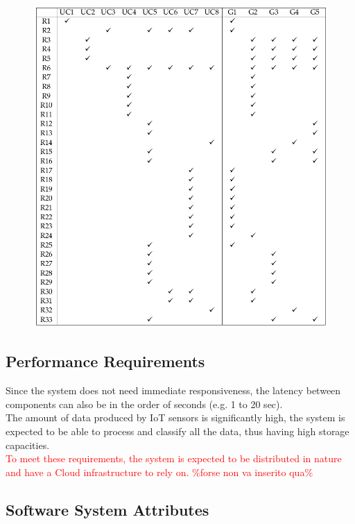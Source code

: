 \documentclass[10pt]{article}
\begin{document}
\begin{figure}[h]
    \includegraphics[scale=0.46]{trac_matrix-1.png} 
    \end{figure}
\newpage
\subsection{Performance Requirements}
Since the system does not need immediate responsiveness, the latency between components can also be in the order of seconds (e.g. 1 to 20 sec).\\
The amount of data produced by IoT sensors is significantly high, the system is expected to be able to process and classify all the data, thus having high storage capacities.\\
\textcolor{red}{To meet these requirements, the system is expected to be distributed in nature and have a Cloud infrastructure to rely on. \%forse non va inserito qua\%}
\subsection{Software System Attributes}
\end{document}
